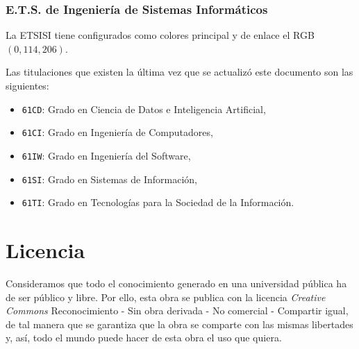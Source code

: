 \subsection{E.T.S. de Ingeniería de Sistemas Informáticos}

La ETSISI tiene configurados como colores principal y de enlace el RGB $(0,114,206)$.

Las titulaciones que existen la última vez que se actualizó este documento son las siguientes:

\begin{itemize}
    \item \texttt{61CD}: Grado en Ciencia de Datos e Inteligencia Artificial,
    \item \texttt{61CI}: Grado en Ingeniería de Computadores,
    \item \texttt{61IW}: Grado en Ingeniería del Software,
    \item \texttt{61SI}: Grado en Sistemas de Información,
    \item \texttt{61TI}: Grado en Tecnologías para la Sociedad de la Información.
\end{itemize}

\chapter{Licencia}
\label{ch:licencia}

Consideramos que todo el conocimiento generado en una universidad pública ha de ser público y libre. Por ello, esta obra se publica con la licencia \textit{Creative Commons} Reconocimiento - Sin obra derivada - No comercial - Compartir igual, de tal manera que se garantiza que la obra se comparte con las mismas libertades y, así, todo el mundo puede hacer de esta obra el uso que quiera.

